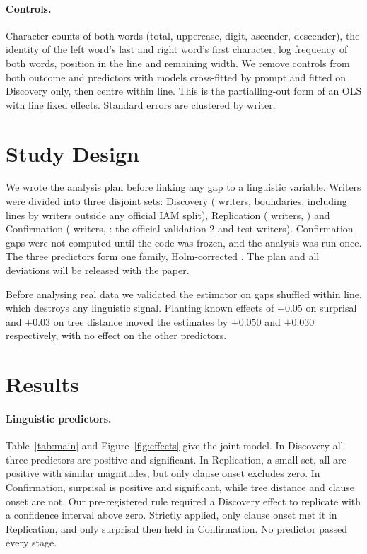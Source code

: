 \documentclass[11pt]{article}
\begin{document}
\paragraph{Controls.} Character counts of both words (total, uppercase, digit, ascender, descender), the identity of the left word's last and right word's first character, log frequency of both words, position in the line and remaining width. We remove controls from both outcome and predictors with models cross-fitted by prompt and fitted on Discovery only, then centre within line. This is the partialling-out form of an OLS with line fixed effects. Standard errors are clustered by writer.

\section{Study Design}
We wrote the analysis plan before linking any gap to a linguistic variable. Writers were divided into three disjoint sets: Discovery (\wDisc{} writers, \nDisc{} boundaries, including lines by writers outside any official IAM split), Replication (\wRep{} writers, \nRep{}) and Confirmation (\wConf{} writers, \nConf{}: the official validation-2 and test writers). Confirmation gaps were not computed until the code was frozen, and the analysis was run once. The three predictors form one family, Holm-corrected \citep{holm1979}. The plan and all deviations will be released with the paper.

Before analysing real data we validated the estimator on gaps shuffled within line, which destroys any linguistic signal. Planting known effects of \(+0.05\) on surprisal and \(+0.03\) on tree distance moved the estimates by \(+0.050\) and \(+0.030\) respectively, with no effect on the other predictors.

\section{Results}
\paragraph{Linguistic predictors.} Table~\ref{tab:main} and Figure~\ref{fig:effects} give the joint model. In Discovery all three predictors are positive and significant. In Replication, a small set, all are positive with similar magnitudes, but only clause onset excludes zero. In Confirmation, surprisal is positive and significant, while tree distance and clause onset are not. Our pre-registered rule required a Discovery effect to replicate with a confidence interval above zero. Strictly applied, only clause onset met it in Replication, and only surprisal then held in Confirmation. No predictor passed every stage.
\end{document}
